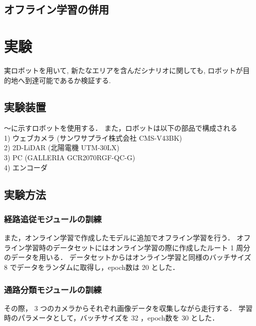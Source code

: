 \documentclass[10pt]{jarticle}
\begin{document}
    \subsection{オフライン学習の併用}
    
    \section{実験}%
    実ロボットを用いて, 新たなエリアを含んだシナリオに関しても, ロボットが目的地へ到達可能であるか検証する.
    \subsection{実験装置}
    ～に示すロボットを使用する．
    また，ロボットは以下の部品で構成される\\
    1) ウェブカメラ (サンワサプライ株式会社 CMS-V43BK)\\
    2) 2D-LiDAR (北陽電機 UTM-30LX)\\
    3) PC (GALLERIA GCR2070RGF-QC-G)\\
    4) エンコーダ\\
    \subsection{実験方法}

    \subsubsection{経路追従モジュールの訓練}
    また，オンライン学習で作成したモデルに追加でオフライン学習を行う．
    オフライン学習時のデータセットにはオンライン学習の際に作成したルート 1 周分のデータを用いる．
    データセットからはオンライン学習と同様のバッチサイズ 8 でデータをランダムに取得し，epoch数は 20 とした．
   
    \subsubsection{通路分類モジュールの訓練}
    その際， 3 つのカメラからそれぞれ画像データを収集しながら走行する．
    学習時のパラメータとして，バッチサイズを 32 ，epoch数を 30 とした．
\end{document}
